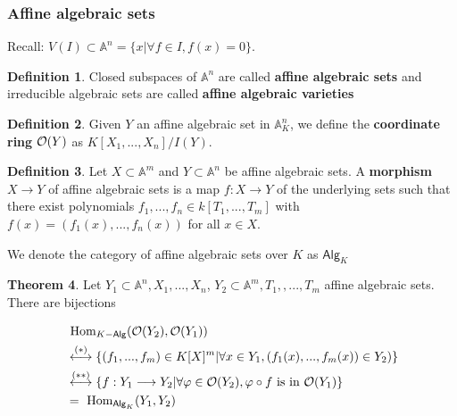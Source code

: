 \documentclass[11pt]{article}
\theoremstyle{definition}
\newtheorem{thm}{Theorem}[section]
\newtheorem{dfn}[thm]{Definition}
\renewcommand{\hom}{\text{ Hom}}
\newcommand{\affn}{\mathbb A}
\newcommand{\calo}{{\cal O}}
\newcommand{\lrta}{\longrightarrow}
\newcommand{\llrta}{\longleftrightarrow}
\begin{document}
\subsubsection{Affine algebraic sets}
Recall: $V(I)\subset \affn^n =\{x|\forall f\in I, f(x)=0\}$.
\begin{dfn}
Closed subspaces of $\affn^n$ are called \textbf{affine algebraic sets} and irreducible algebraic sets are called \textbf{affine algebraic varieties}
\end{dfn}
\begin{dfn}
Given $Y$ an affine algebraic set in $\affn^n_K$, we define the \textbf{coordinate ring} $\calo(Y)$ as $K[X_1,...,X_n]/I(Y)$.
\end{dfn}
\begin{dfn}
Let $X\subset \affn^m$ and $Y \subset \affn^n$ be affine algebraic sets. A \textbf{morphism} $X \lrta Y$ of affine algebraic sets is a map $f : X \lrta Y$ of the underlying sets such that there exist polynomials $f_1,...,f_n \in k[T_1,...,T_m]$ with $f(x) = (f_1(x),...,f_n(x))$ for all $x\in X$. 
\end{dfn}
We denote the category of affine algebraic sets over $K$ as $\mathsf{Alg}_K$
\begin{thm}\label{thm:equivalence_of_categories_algebraic_sets_K_algebras}
Let $Y_1\subset \affn^n, X_1,...,X_n$, $Y_2\subset \affn^m, T_1,,..., T_m$ affine algebraic sets. There are bijections 

$$
\begin{aligned}
&\hom_{K\mathsf{-Alg}}(\calo(Y_2),\calo(Y_1))
\\
&\overset{(*)}{\llrta}\{(f_1,...,f_m)\in K[X]^m|\forall x\in Y_1,(f_1(x),...,f_m(x))\in Y_2) \}\\
&\overset{(**)}{\llrta} \{f:Y_1\lrta Y_2|\forall \varphi\in \calo(Y_2),\varphi\circ f\text{ is  in }  \calo(Y_1)\}\\
&=\hom_{\mathsf{Alg}_K}(Y_1,Y_2)
\end{aligned}
$$
\end{thm}
\end{document}
